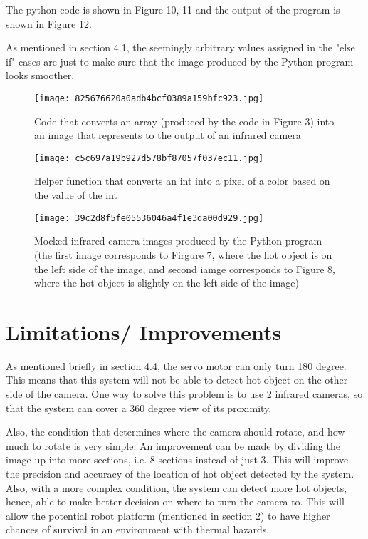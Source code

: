 \documentclass[12pt]{article}
\begin{document}
The python code is shown in Figure 10, 11 and the output of the program is shown in Figure 12.

As mentioned in section 4.1, the seemingly arbitrary values assigned in the "else if" cases are just to make sure that the image produced by the Python program looks smoother.

\begin{figure}[h]
\texttt{[image: 825676620a0adb4bcf0389a159bfc923.jpg]}
\caption{Code that converts an array (produced by the code in Figure 3) into an image that represents to the output of an infrared camera}
\end{figure}
\pagebreak

\begin{figure}[h]
\texttt{[image: c5c697a19b927d578bf87057f037ec11.jpg]}
\caption{Helper function that converts an int into a pixel of a color based on the value of the int}
\end{figure}
\pagebreak

\begin{figure}[h]
\texttt{[image: 39c2d8f5fe05536046a4f1e3da00d929.jpg]}
\centering
\caption{Mocked infrared camera images produced by the Python program (the first image corresponds to Firgure 7, where the hot object is on the left side of the image, and second iamge corresponds to Figure 8, where the hot object is slightly on the left side of the image)}
\end{figure}

\section {Limitations/ Improvements}
As mentioned briefly in section 4.4, the servo motor can only turn 180 degree. This means that this system will not be able to detect hot object on the other side of the camera. One way to solve this problem is to use 2 infrared cameras, so that the system can cover a 360 degree view of its proximity.

Also, the condition that determines where the camera should rotate, and how much to rotate is very simple. An improvement can be made by dividing the image up into more sections, i.e. 8 sections instead of just 3. This will improve the precision and accuracy of the location of hot object detected by the system. Also, with a more complex condition, the system can detect more hot objects, hence, able to make better decision on where to turn the camera to. This will allow the potential robot platform (mentioned in section 2) to have higher chances of survival in an environment with thermal hazards.

\end{document}
